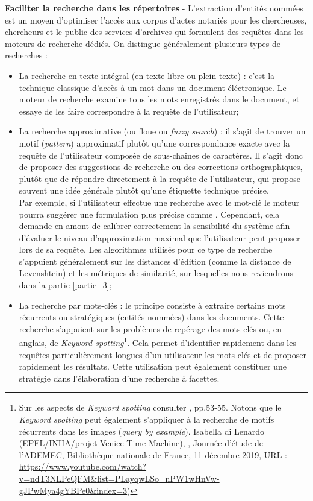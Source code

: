 \textbf{Faciliter la recherche dans les répertoires} - L'extraction d'entités nommées est un moyen d'optimiser l'accès aux corpus d'actes notariés pour les chercheuses, chercheurs et le public des services d'archives qui formulent des requêtes dans les moteurs de recherche dédiés. On distingue généralement plusieurs types de recherches : 
\newpage
\begin{itemize}
    \item La recherche en texte intégral (en texte libre ou plein-texte) : c'est la technique classique d'accès à un mot dans un document éléctronique. Le moteur de recherche examine tous les mots enregistrés dans le document, et essaye de les faire correspondre à la requête de l'utilisateur;\\
    \item La recherche approximative (ou floue ou \textit{fuzzy search}) : il s'agit de trouver un motif (\textit{pattern}) approximatif plutôt qu'une correspondance exacte avec la requête de l'utilisateur composée de sous-chaînes de caractères. Il s'agit donc de proposer des suggestions de recherche ou des corrections orthographiques, plutôt que de répondre directement à la requête de l'utilisateur, qui propose souvent une idée générale plutôt qu'une étiquette technique précise.\\Par exemple, si l'utilisateur effectue une recherche avec le mot-clé  le moteur pourra suggérer une formulation plus précise comme . Cependant, cela demande en amont de calibrer correctement la sensibilité du système afin d'évaluer le niveau d'approximation maximal que l'utilisateur peut proposer lors de sa requête.
    Les algorithmes utilisés pour ce type de recherche s'appuient généralement sur les distances d'édition (comme la distance de Levenshtein) et les métriques de similarité, sur lesquelles nous reviendrons dans la partie \ref{partie_3};\\
    \item La recherche par mots-clés : le principe consiste à extraire certains mots récurrents ou stratégiques (entités nommées) dans les documents. Cette recherche s'appuient sur les problèmes de repérage des mots-clés ou, en anglais, de \textit{Keyword spotting}\footnote{Sur les aspects de \textit{Keyword spotting} consulter \cite{bonhomme_defis_2018}, pp.53-55. Notons que le \textit{Keyword spotting} peut également s'appliquer à la recherche de motifs récurrents dans les images (\textit{query by example}). Isabella di Lenardo (EPFL/INHA/projet Venice Time Machine), , Journée d'étude  de l'ADEMEC, Bibliothèque nationale de France, 11 décembre 2019, URL : \url{https://www.youtube.com/watch?v=ndT3NLPeQFM&list=PLayqwLSo_nPW1wHnVw-gJPwMya4gYBPe0&index=3})}. Cela permet d'identifier rapidement dans les requêtes particulièrement longues d'un utilisateur les mots-clés et de proposer rapidement les résultats. Cette utilisation peut également constituer une stratégie dans l'élaboration d'une recherche à facettes. 
\end{itemize}
